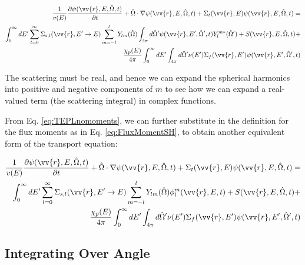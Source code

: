 \documentclass[10pt]{article}
\begin{document}
\begin{flushleft}
\begin{equation}
\label{eq:TEPLnomoments}
\begin{aligned}
\frac{1}{v(E)} \frac{\partial\psi(\vv{r}, E, \hat{\Omega},t)}{\partial t} +
 \hat{\Omega}\cdot\nabla\psi(\vv{r}, E, \hat{\Omega},t) + 
 \Sigma_t(\vv{r},E)\psi(\vv{r}, E, \hat{\Omega},t) = \\
 \int_{0}^{\infty}dE' \sum_{l=0}^{\infty} \Sigma_{s,l}(\vv{r}, E'\rightarrow E) \sum_{m=-l}^{l} Y_{lm}(\hat{\Omega})\int_{4\pi}^{} d\hat{\Omega}'\psi(\vv{r}, E', \hat{\Omega}', t)Y_l^{m*}(\hat{\Omega}') + S(\vv{r}, E, \hat{\Omega},t)+\\
 \frac{\chi_p(E)}{4\pi} \int_{0}^{\infty} dE'\int_{4\pi}^{} d\hat{\Omega}'\nu(E')\Sigma_f(\vv{r}, E')\psi(\vv{r}, E', \hat{\Omega}',t)\\
\end{aligned}
\end{equation}

The scattering must be real, and hence we can expand the spherical harmonics into positive and negative components of \(m\) to see how we can expand a real-valued term (the scattering integral) in complex functions. 

From Eq. \eqref{eq:TEPLnomoments}, we can further substitute in the definition for the flux moments as in Eq. \ref{eq:FluxMomentSH},  to obtain another equivalent form of the transport equation:

\begin{equation}
\label{eq:TEPL}
\begin{aligned}
\frac{1}{v(E)} \frac{\partial\psi(\vv{r}, E, \hat{\Omega},t)}{\partial t} +
 \hat{\Omega}\cdot\nabla\psi(\vv{r}, E, \hat{\Omega},t) + 
 \Sigma_t(\vv{r},E)\psi(\vv{r}, E, \hat{\Omega},t) = \\
 \int_{0}^{\infty}dE' \sum_{l=0}^{\infty} \Sigma_{s,l}(\vv{r}, E'\rightarrow E) \sum_{m=-l}^{l} Y_{lm}(\hat{\Omega})\phi_l^m(\vv{r}, E, t) + S(\vv{r}, E, \hat{\Omega},t)+\\
\frac{\chi_p(E)}{4\pi} \int_{0}^{\infty} dE'\int_{4\pi}^{} d\hat{\Omega}'\nu(E')\Sigma_f(\vv{r}, E')\psi(\vv{r}, E', \hat{\Omega}',t)\\
\end{aligned}
\end{equation}

\subsection{Integrating Over Angle}


\end{flushleft}
\end{document}
